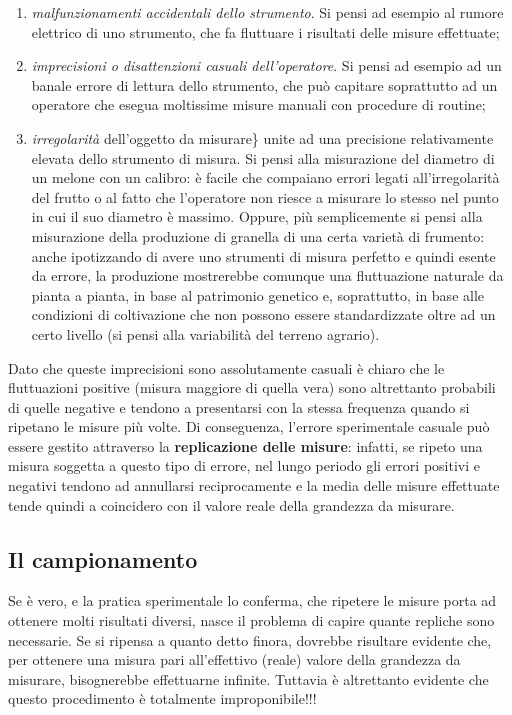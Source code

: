 \documentclass[a4paper,12pt,oneside]{book}
\providecommand{\tightlist}{%
  \setlength{\itemsep}{0pt}\setlength{\parskip}{0pt}}
\begin{document}
\begin{enumerate}
\def\labelenumi{\arabic{enumi}.}
\tightlist
\item
  \emph{malfunzionamenti accidentali dello strumento}. Si pensi ad
  esempio al rumore elettrico di uno strumento, che fa fluttuare i
  risultati delle misure effettuate;
\item
  \emph{imprecisioni o disattenzioni casuali dell'operatore}. Si pensi
  ad esempio ad un banale errore di lettura dello strumento, che può
  capitare soprattutto ad un operatore che esegua moltissime misure
  manuali con procedure di routine;
\item
  \emph{irregolarità} dell'oggetto da misurare\} unite ad una precisione
  relativamente elevata dello strumento di misura. Si pensi alla
  misurazione del diametro di un melone con un calibro: è facile che
  compaiano errori legati all'irregolarità del frutto o al fatto che
  l'operatore non riesce a misurare lo stesso nel punto in cui il suo
  diametro è massimo. Oppure, più semplicemente si pensi alla
  misurazione della produzione di granella di una certa varietà di
  frumento: anche ipotizzando di avere uno strumenti di misura perfetto
  e quindi esente da errore, la produzione mostrerebbe comunque una
  fluttuazione naturale da pianta a pianta, in base al patrimonio
  genetico e, soprattutto, in base alle condizioni di coltivazione che
  non possono essere standardizzate oltre ad un certo livello (si pensi
  alla variabilità del terreno agrario).
\end{enumerate}

Dato che queste imprecisioni sono assolutamente casuali è chiaro che le
fluttuazioni positive (misura maggiore di quella vera) sono altrettanto
probabili di quelle negative e tendono a presentarsi con la stessa
frequenza quando si ripetano le misure più volte. Di conseguenza,
l'errore sperimentale casuale può essere gestito attraverso la
\textbf{replicazione delle misure}: infatti, se ripeto una misura
soggetta a questo tipo di errore, nel lungo periodo gli errori positivi
e negativi tendono ad annullarsi reciprocamente e la media delle misure
effettuate tende quindi a coincidero con il valore reale della grandezza
da misurare.

\subsection{Il campionamento}\label{il-campionamento}

Se è vero, e la pratica sperimentale lo conferma, che ripetere le misure
porta ad ottenere molti risultati diversi, nasce il problema di capire
quante repliche sono necessarie. Se si ripensa a quanto detto finora,
dovrebbe risultare evidente che, per ottenere una misura pari
all'effettivo (reale) valore della grandezza da misurare, bisognerebbe
effettuarne infinite. Tuttavia è altrettanto evidente che questo
procedimento è totalmente improponibile!!!
\end{document}
